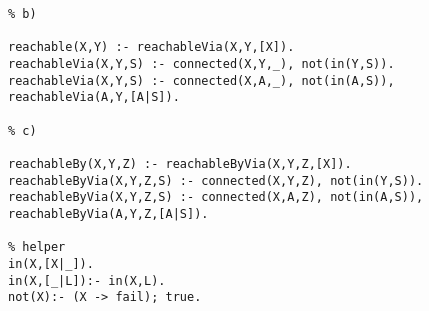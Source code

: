 \begin{verbatim}
% b)

reachable(X,Y) :- reachableVia(X,Y,[X]). 
reachableVia(X,Y,S) :- connected(X,Y,_), not(in(Y,S)). 
reachableVia(X,Y,S) :- connected(X,A,_), not(in(A,S)), reachableVia(A,Y,[A|S]).

% c)
	
reachableBy(X,Y,Z) :- reachableByVia(X,Y,Z,[X]). 
reachableByVia(X,Y,Z,S) :- connected(X,Y,Z), not(in(Y,S)). 
reachableByVia(X,Y,Z,S) :- connected(X,A,Z), not(in(A,S)), reachableByVia(A,Y,Z,[A|S]). 

% helper
in(X,[X|_]).
in(X,[_|L]):- in(X,L).
not(X):- (X -> fail); true.
\end{verbatim}